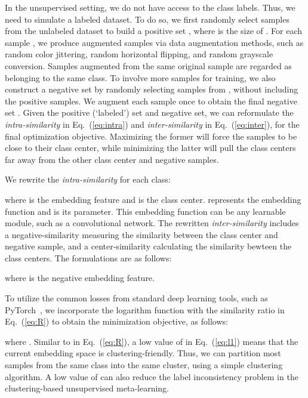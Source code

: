 \documentclass[runningheads]{llncs}
\begin{document}
In the unsupervised setting, we do not have access to the class labels. Thus, we need to simulate a labeled dataset. To do so, we first randomly select  samples from the unlabeled dataset  to build a positive set  , where  is the size of . For each sample , we produce  augmented samples  via data augmentation methods, such as random color jittering, random horizontal flipping, and random grayscale conversion. Samples augmented from the same original sample are regarded as belonging to the same class. To involve more samples for training, we also construct a negative set by randomly selecting  samples from , without including the  positive samples. We augment each sample once to obtain the final negative set . Given the positive (`labeled') set and negative set, we can reformulate the \textit{intra-similarity} in Eq.~(\ref{eq:intra}) and \textit{inter-similarity} in Eq.~(\ref{eq:inter}), for the final optimization objective. Maximizing the former will force the samples to be close to their class center, while minimizing the latter will pull the class centers far away from the other class center and negative samples.

We rewrite the \textit{intra-similarity} for each class:

where  is the embedding feature and  is the class center.  represents the embedding function and  is its parameter. This embedding function can be any learnable module, such as a convolutional network. 
The rewritten \textit{inter-similarity} includes a negative-similarity measuring the similarity between the class center and negative sample, and a center-similarity calculating the similarity bewteen the class centers. The formulations are as follows:

where  is the negative embedding feature.


To utilize the common losses from standard deep learning tools, such as PyTorch~\cite{steiner2019pytorch}, we incorporate the logarithm function with the similarity ratio  in Eq.~(\ref{eq:R}) to obtain the minimization objective, as follows:

where .
Similar to  in Eq.~(\ref{eq:R}), a low value of  in Eq.~(\ref{eq:l1}) means that the current embedding space is clustering-friendly. Thus, we can partition most samples from the same class into the same cluster, using a simple clustering algorithm. A low value of  can also reduce the label inconsistency problem in the clustering-based unsupervised meta-learning. 
\end{document}
